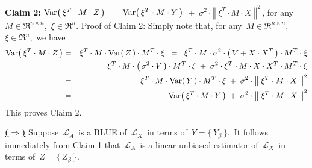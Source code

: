 \begin{enumerate}
	\vskip 0.3cm
	\noindent
	\textbf{Claim 2:}\quad
	$\textnormal{Var}\!\left(\,\xi^{T} \cdot M \cdot Z\,\right)$
	\;$=$\; $\textnormal{Var}\!\left(\,\xi^{T} \cdot M \cdot Y\,\right)$
		\,$+$\, $\sigma^{2} \cdot \left\Vert\; \xi^{T} \cdot M \cdot X \;\right\Vert^{2}$\,,
	for any \,$M \in \Re^{n \times n}$, \,$\xi \in \Re^{n}$.
	\vskip 0.0cm
	\noindent
	Proof of Claim 2:\quad
	Simply note that, for any \,$M \in \Re^{n \times n}$, \,$\xi \in \Re^{n}$,\, we have
	\begin{eqnarray*}
	\textnormal{Var}\!\left(\,\xi^{T} \cdot M \cdot Z\,\right)
	&=&
		\xi^{T} \cdot M \cdot \textnormal{Var}\!\left(\,Z\,\right) \cdot M^{T} \cdot \xi
	\;\; = \;\;
		\xi^{T} \cdot M \cdot \sigma^{2} \cdot \left(\, V + X \cdot X^{T} \,\right) \cdot M^{T} \cdot \xi
	\\
	&=&
		\xi^{T} \cdot M \cdot \left(\,\sigma^{2} \cdot V\,\right) \cdot M^{T} \cdot \xi
		\; + \;
		\sigma^{2} \cdot \xi^{T} \cdot M \cdot X \cdot X^{T} \cdot M^{T} \cdot \xi
	\\
	&=&
		\xi^{T} \cdot M \cdot \textnormal{Var}\!\left(\,Y\,\right) \cdot M^{T} \cdot \xi
		\; + \;
		\sigma^{2} \cdot \left\Vert\; \xi^{T} \cdot M \cdot X \; \right\Vert^{2}
	\\
	&=&
		\textnormal{Var}\!\left(\,\xi^{T} \cdot M \cdot Y\,\right)
		\; + \;
		\sigma^{2} \cdot \left\Vert\; \xi^{T} \cdot M \cdot X \; \right\Vert^{2}
	\end{eqnarray*}
	This proves Claim 2.

	\vskip 0.5cm
	\noindent
	\underline{\textbf{(\;$\Longrightarrow$\;)}}\quad
	Suppose \,$\mathcal{L}_{A}$\, is a BLUE of \,$\mathcal{L}_{X}$\, in terms of \,$Y = \{\,Y_{\beta}\,\}$.\,
	It follows immediately from Claim 1 that
	\,$\mathcal{L}_{A}$\, is a linear unbiased estimator of
	\,$\mathcal{L}_{X}$\, in terms of \,$Z = \{\,Z_{\beta}\,\}$.
	

\end{enumerate}
